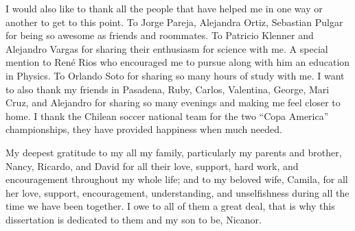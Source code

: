 \documentclass[14pt]{caltech_thesis}
\begin{document}
\begin{acknowledgements}
I would also like to thank all the people that have helped me in one
way or another to get to this point. To Jorge Pareja, Alejandra Ortiz,
Sebastian Pulgar for being so awesome as friends and roommates. To
Patricio Klenner and Alejandro Vargas for sharing their enthusiasm for
science with me. A special mention to Ren\'e Rios who encouraged me
to pursue along with him an education in Physics. To Orlando Soto for
sharing so many hours of study with me. I want to also thank my
friends in Pasadena, Ruby, Carlos, Valentina, George, Mari Cruz, and
Alejandro for sharing so many evenings and making me feel closer to
home. I thank the Chilean soccer national team for the two ``Copa
America'' championships, they have provided happiness when much
needed.

My deepest gratitude to my all my family, particularly my parents and brother,
Nancy, Ricardo, and David for all their love, support, hard work, and
encouragement throughout my whole life; and to my beloved wife, Camila,
for all her love, support, encouragement, understanding, and
unselfishness during all the time we have been together. I owe to all
of them a great deal, that is why this
dissertation is dedicated to them and my son to be, Nicanor.
 

\end{acknowledgements}
\end{document}
